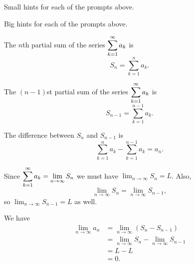 \begin{smallhint}
\ba
	\item Small hints for each of the prompts above.
\ea
\end{smallhint}
\begin{bighint}
\ba
	\item Big hints for each of the prompts above.
\ea
\end{bighint}
\begin{activitySolution}
\ba
	\item The $n$th partial sum of the series $\displaystyle \sum_{k=1}^{\infty} a_k$ is
\[S_n = \sum_{k=1}^n a_k.\]
    \item The $(n-1)$st partial sum of the series $\displaystyle \sum_{k=1}^{\infty} a_k$ is
\[S_{n-1} = \sum_{k=1}^{n-1} a_k.\]
    \item The difference between $S_n$ and $S_{n-1}$ is
\[\sum_{k=1}^{n} a_k - \sum_{k=1}^{n-1} a_k = a_{n}.\]
    \item Since  $\displaystyle \sum_{k=1}^{\infty} a_k = \lim_{n \to \infty} S_n$ we must have $\lim_{n \to \infty} S_n = L$. Also,
\[\lim_{n \to \infty} S_n = \lim_{n \to \infty} S_{n-1},\]
so $\lim_{n \to \infty} S_{n-1} = L$ as well.
    \item We have
\begin{align*}
\lim_{n \to \infty} a_n &= \lim_{n \to \infty} \left(S_n - S_{n-1}\right) \\
    &= \lim_{n \to \infty} S_n - \lim_{n \to \infty} S_{n-1} \\
    &= L - L \\
    &= 0.
\end{align*}

\ea
\end{activitySolution}
\aftera 
